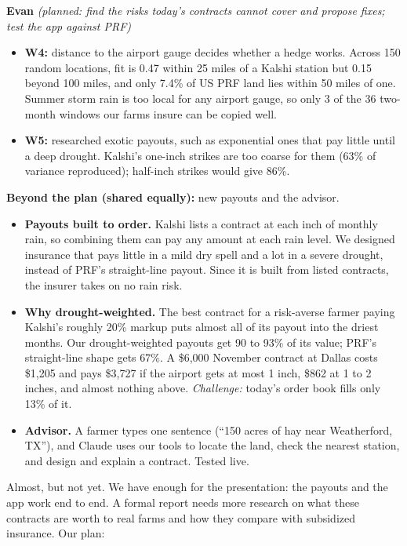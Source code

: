 \documentclass[10pt]{article}
\newcommand{\head}[1]{\par\vspace{4pt}{\large\bfseries #1}\par\vspace{1pt}}
\newcommand{\person}[2]{\par\vspace{2pt}\textbf{#1} \textit{(planned: #2)}}
\begin{document}
\person{Evan}{find the risks today's contracts cannot cover and propose fixes;
test the app against PRF}
\begin{itemize}
  \item \textbf{W4:} distance to the airport gauge decides whether a hedge
    works. Across 150 random locations, fit is 0.47 within 25 miles of a
    Kalshi station but 0.15 beyond 100 miles, and only 7.4\% of US PRF land
    lies within 50 miles of one. Summer storm rain is too local for any
    airport gauge, so only 3 of the 36 two-month windows our farms insure can
    be copied well.
  \item \textbf{W5:} researched exotic payouts, such as exponential ones that
    pay little until a deep drought. Kalshi's one-inch strikes are too coarse
    for them (63\% of variance reproduced); half-inch strikes would give 86\%.
\end{itemize}

\textbf{Beyond the plan (shared equally):} new payouts and the advisor.
\begin{itemize}
  \item \textbf{Payouts built to order.} Kalshi lists a contract at each inch
    of monthly rain, so combining them can pay any amount at each rain level.
    We designed insurance that pays little in a mild dry spell and a lot in a
    severe drought, instead of PRF's straight-line payout. Since it is built
    from listed contracts, the insurer takes on no rain risk.
  \item \textbf{Why drought-weighted.} The best contract for a risk-averse
    farmer paying Kalshi's roughly 20\% markup puts almost all of its payout
    into the driest months. Our drought-weighted payouts get 90 to 93\% of its
    value; PRF's straight-line shape gets 67\%. A \$6,000 November contract at
    Dallas costs \$1,205 and pays \$3,727 if the airport gets at most 1 inch,
    \$862 at 1 to 2 inches, and almost nothing above. \emph{Challenge:}
    today's order book fills only 13\% of it.
  \item \textbf{Advisor.} A farmer types one sentence (``150 acres of hay near
    Weatherford, TX''), and Claude uses our tools to locate the land, check
    the nearest station, and design and explain a contract. Tested live.
\end{itemize}

\head{2. Are the final results ready?}
Almost, but not yet. We have enough for the presentation: the payouts and the
app work end to end. A formal report needs more research on what these
contracts are worth to real farms and how they compare with subsidized
insurance. Our plan:
\end{document}
